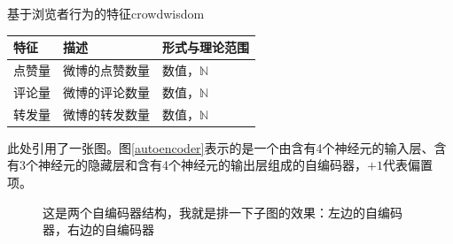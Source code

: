 \documentclass[a4paper,AutoFakeBold,oneside,12pt]{book}
\begin{document}
{{\begin{bupttable}{基于浏览者行为的特征}{crowdwisdom}
    \begin{tabular}{l|l|l}
		\hline \textbf{特征} & \textbf{描述} & \textbf{形式与理论范围}\\
		\hline 点赞量 & 微博的点赞数量 & 数值，$\mathbb{N}$ \\
		\hline 评论量 & 微博的评论数量 & 数值，$\mathbb{N}$ \\
		\hline 转发量 & 微博的转发数量 & 数值，$\mathbb{N}$ \\
		\hline
    \end{tabular}
\end{bupttable}

此处引用了一张图。图\ref{autoencoder}表示的是一个由含有4个神经元的输入层、含有3个神经元的隐藏层和含有4个神经元的输出层组成的自编码器，$+1$代表偏置项。


\begin{figure}[!htbp]
    \centering
    \quad %
    \caption{这是两个自编码器结构，我就是排一下子图的效果：\protect{}左边的自编码器，\protect{}右边的自编码器} %
    \label{Fig:RecAccuracy} %
\end{figure}

}}
\end{document}
